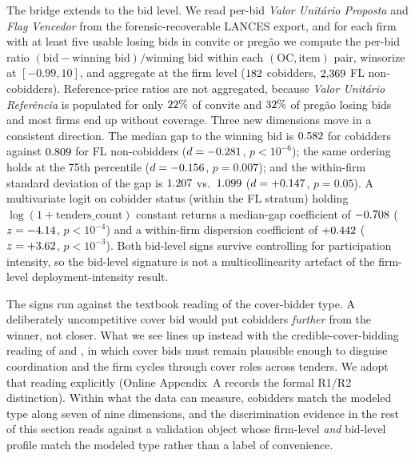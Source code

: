 

The bridge extends to the bid level. We read per-bid
\textit{Valor Unitário Proposta} and \textit{Flag Vencedor} from
the forensic-recoverable LANCES export, and for each firm with
at least five usable losing bids in convite or pregão we compute
the per-bid ratio
$(\text{bid}-\text{winning bid})/\text{winning bid}$ within each
$(\text{OC}, \text{item})$ pair, winsorize at $[-0.99, 10]$, and
aggregate at the firm level ($182$ cobidders,
$2{,}369$ FL non-cobidders). Reference-price ratios are
not aggregated, because \textit{Valor Unitário Referência} is
populated for only $22\%$ of convite and
$32\%$ of pregão losing bids and most firms
end up without coverage. Three new dimensions move in a
consistent direction. The median gap to the winning bid is
$0.582$ for cobidders against $0.809$
for FL non-cobidders ($d=-0.281$, $p<10^{-6}$); the
same ordering holds at the 75th percentile
($d=-0.156$, $p=0.007$); and the within-firm standard
deviation of the gap is $1.207$ vs.\
$1.099$ ($d=+0.147$, $p=0.05$). A
multivariate logit on cobidder status (within the FL stratum)
holding $\log(1+\text{tenders\_count})$ constant returns a
median-gap coefficient of $-0.708$
($z=-4.14$, $p<10^{-4}$) and a within-firm
dispersion coefficient of $+0.442$
($z=+3.62$, $p<10^{-3}$). Both bid-level signs
survive controlling for participation intensity, so the
bid-level signature is not a multicollinearity artefact of the
firm-level deployment-intensity result.



The signs run against the textbook reading of the cover-bidder
type. A deliberately uncompetitive cover bid would put cobidders
\emph{further} from the winner, not closer. What we see lines up
instead with the credible-cover-bidding reading of
\citet{marshall2012economics} and \citet{asker2010leniency}, in
which cover bids must remain plausible enough to disguise
coordination and the firm cycles through cover roles across
tenders. We adopt that reading explicitly (Online Appendix~A
records the formal R1/R2 distinction). Within what the data can
measure, cobidders match the modeled type along seven of nine
dimensions, and the discrimination evidence in the rest of this
section reads against a validation object whose firm-level
\emph{and} bid-level profile match the modeled type rather than
a label of convenience.

